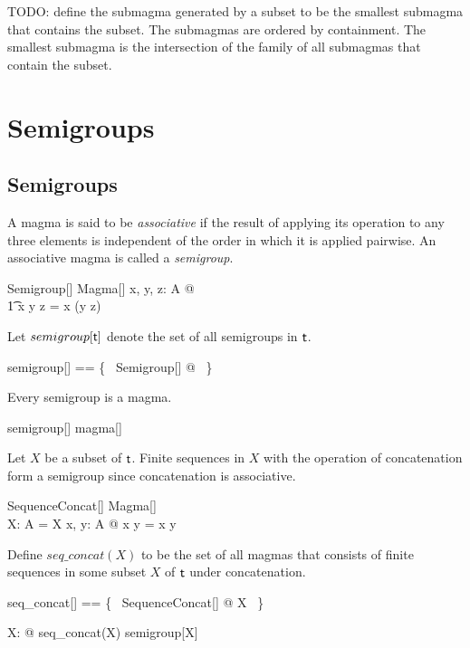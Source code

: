 \documentclass{amsart}
\begin{document}
TODO: define the submagma generated by a subset to be the smallest submagma that
contains the subset. The submagmas are ordered by containment.
The smallest submagma is the intersection of the family of all submagmas that contain the subset.

\section{Semigroups}

\subsection{Semigroups}

A magma is said to be \textit{associative} if the result of applying its operation to any three elements
is independent of the order in which it is applied pairwise.
An associative magma is called a \textit{semigroup}.

\begin{schema}{Semigroup}[\genT]
	Magma[\genT]
\where
	\forall x, y, z: A @ \\
	\t1	x \opG y \opG z = x \opG (y \opG z)
\end{schema}

Let $semigroup[\mathsf{t}]$ denote the set of all semigroups in $\mathsf{t}$.

\begin{zed}
	semigroup[\genT] == \{~ Semigroup[\genT] @ \strucA  ~\}
\end{zed}

\begin{remark} Every semigroup is a magma.

\begin{zed}
	semigroup[\setT] \subseteq magma[\setT]
\end{zed}

\end{remark}

\begin{example}
Let $X$ be a subset of $\mathsf{t}$.
Finite sequences in $X$ with the operation of concatenation form a semigroup
since concatenation is associative.

\begin{schema}{SequenceConcat}[\genT]
	Magma[\seq \genT] \\
	X: \power \genT
\where
	A = \seq X
\also
	\forall x, y: A @ x \opG y = x \cat y
\end{schema}

Define $seq\_concat(X)$ to be the set of all magmas that consists of finite sequences in some subset
$X$ of $\mathsf{t}$ under concatenation.

\begin{zed}
	seq\_concat[\genT] == \{~ SequenceConcat[\genT] @ X \mapsto \strucA ~\}
\end{zed}

\begin{zed}
	\forall X: \power \setT @ seq\_concat(X) \in semigroup[\seq X]
\end{zed}

\end{example}
\end{document}
